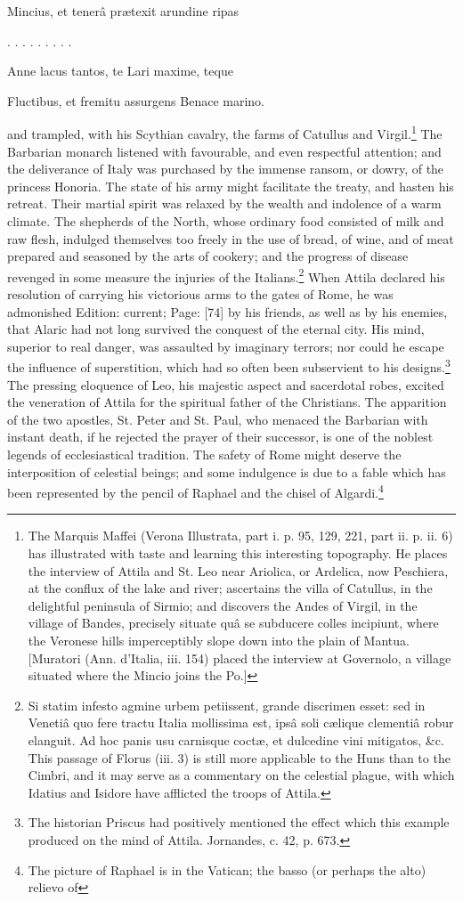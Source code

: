 {Mincius, et tenerâ prætexit arundine ripas

. . . . . . . . .

Anne lacus tantos, te Lari maxime, teque

Fluctibus, et fremitu assurgens Benace marino.} and trampled, with his Scythian cavalry, the farms of Catullus and Virgil.\footnote{The Marquis Maffei (Verona Illustrata, part i. p. 95, 129, 221, part ii. p. ii. 6) has illustrated with taste and learning this interesting topography. He places the interview of Attila and St. Leo near Ariolica, or Ardelica, now Peschiera, at the conflux of the lake and river; ascertains the villa of Catullus, in the delightful peninsula of Sirmio; and discovers the Andes of Virgil, in the village of Bandes, precisely situate quâ se subducere colles incipiunt, where the Veronese hills imperceptibly slope down into the plain of Mantua. [Muratori (Ann. d\texthebrew{}’Italia, iii. 154) placed the interview at Governolo, a village situated where the Mincio joins the Po.]} The Barbarian monarch listened with favourable, and even respectful attention; and the deliverance of Italy was purchased by the immense ransom, or dowry, of the princess Honoria. The state of his army might facilitate the treaty, and hasten his retreat. Their martial spirit was relaxed by the wealth and indolence of a warm climate. The shepherds of the North, whose ordinary food consisted of milk and raw flesh, indulged themselves too freely in the use of bread, of wine, and of meat prepared and seasoned by the arts of cookery; and the progress of disease revenged in some measure the injuries of the Italians.\footnote{Si statim infesto agmine urbem petiissent, grande discrimen esset: sed in Venetiâ quo fere tractu Italia mollissima est, ipsâ soli cælique clementiâ robur elanguit. Ad hoc panis usu carnisque coctæ, et dulcedine vini mitigatos, \&c. This passage of Florus (iii. 3) is still more applicable to the Huns than to the Cimbri, and it may serve as a commentary on the celestial plague, with which Idatius and Isidore have afflicted the troops of Attila.} When Attila declared his resolution of carrying his victorious arms to the gates of Rome, he was admonished Edition: current; Page: [74] by his friends, as well as by his enemies, that Alaric had not long survived the conquest of the eternal city. His mind, superior to real danger, was assaulted by imaginary terrors; nor could he escape the influence of superstition, which had so often been subservient to his designs.\footnote{The historian Priscus had positively mentioned the effect which this example produced on the mind of Attila. Jornandes, c. 42, p. 673.} The pressing eloquence of Leo, his majestic aspect and sacerdotal robes, excited the veneration of Attila for the spiritual father of the Christians. The apparition of the two apostles, St. Peter and St. Paul, who menaced the Barbarian with instant death, if he rejected the prayer of their successor, is one of the noblest legends of ecclesiastical tradition. The safety of Rome might deserve the interposition of celestial beings; and some indulgence is due to a fable which has been represented by the pencil of Raphael and the chisel of Algardi.\footnote{The picture of Raphael is in the Vatican; the basso (or perhaps the alto) relievo of }
